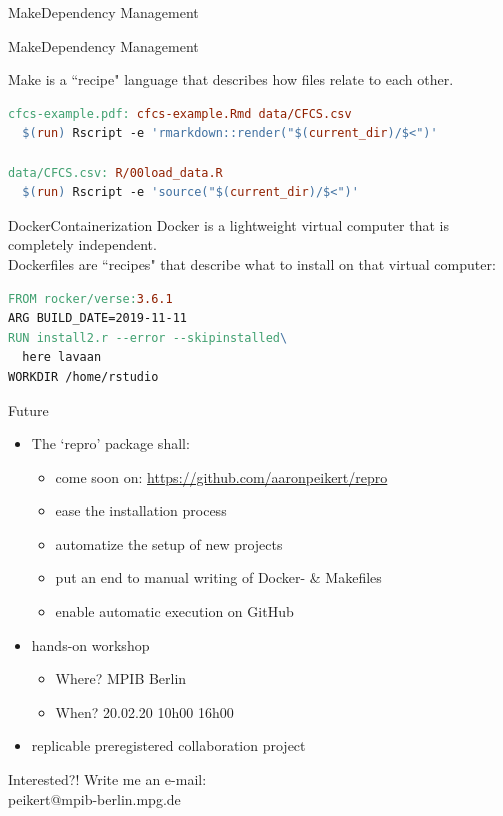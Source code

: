 \documentclass[12pt,t]{beamer}
\begin{document}
{\begin{frame}[c]{Make\textemdash{}Dependency Management}
\end{frame}

\begin{frame}[c, fragile]{Make\textemdash{}Dependency Management}

Make is a ``recipe" language that describes how files relate to each other.
\vspace{10mm}
\begin{lstlisting}[language=make,basicstyle=\ttfamily\scriptsize]
cfcs-example.pdf: cfcs-example.Rmd data/CFCS.csv
  $(run) Rscript -e 'rmarkdown::render("$(current_dir)/$<")'

data/CFCS.csv: R/00load_data.R
  $(run) Rscript -e 'source("$(current_dir)/$<")'
\end{lstlisting}
\end{frame}

\begin{frame}[c, fragile]{Docker\textemdash{}Containerization}
	Docker is a lightweight virtual computer that is completely independent.\\
	Dockerfiles are ``recipes" that describe what to install on that virtual computer:
	\vspace{10mm}
	\begin{lstlisting}[language=make,basicstyle=\ttfamily\scriptsize]
FROM rocker/verse:3.6.1
ARG BUILD_DATE=2019-11-11
RUN install2.r --error --skipinstalled\
  here lavaan
WORKDIR /home/rstudio
\end{lstlisting}
\end{frame}

\begin{frame}[c]{Future}

\begin{itemize}
	\item The `repro' package shall:
	\begin{itemize}
		\item come soon on: \href{https://github.com/aaronpeikert/repro}{https://github.com/aaronpeikert/repro}
		\item ease the installation process
		\item automatize the setup of new projects
		\item put an end to manual writing of Docker- \& Makefiles
		\item enable automatic execution on GitHub
	\end{itemize}
	\item hands-on workshop
	\begin{itemize}
		\item Where? MPIB Berlin
		\item When? 20.02.20 10h00 \textendash{} 16h00
	\end{itemize}
	\item \textcolor{lolit}{replicable preregistered collaboration project}
\end{itemize}
\vspace{10mm}
Interested?! Write me an e-mail:\\ \hfill \textcolor{lolit}{peikert@mpib-berlin.mpg.de}
\end{frame}

}
\end{document}
